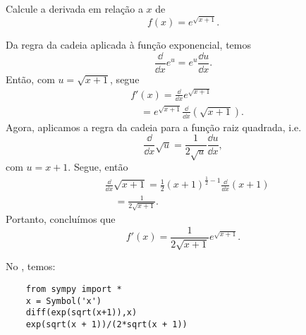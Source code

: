 \begin{exeresol}
  Calcule a derivada em relação a $x$ de
  \begin{equation}
    f(x) = e^{\sqrt{x+1}}.
  \end{equation}
\end{exeresol}
\begin{resol}
  Da regra da cadeia aplicada à função exponencial, temos
  \begin{equation}
    \frac{\dd}{\dd x}e^u = e^u\frac{\dd u}{\dd x}.
  \end{equation}
  Então, com $u = \sqrt{x+1}$, segue
  \begin{align}
    & f'(x) = \frac{\dd}{\dd x}e^{\sqrt{x+1}} \\
    & \text{}\quad = e^{\sqrt{x+1}}\frac{\dd}{\dd x}\left(\sqrt{x+1}\right).
  \end{align}
  Agora, aplicamos a regra da cadeia para a função raiz quadrada, i.e.
  \begin{equation}
    \frac{\dd}{\dd x}\sqrt{u} = \frac{1}{2\sqrt{u}}\frac{\dd u}{\dd x},
  \end{equation}
  com $u = x+1$. Segue, então
  \begin{align}
    & \frac{\dd}{\dd x}\sqrt{x+1} = \frac{1}{2}(x+1)^{\frac{1}{2}-1}\frac{\dd}{\dd x}(x+1) \\
    & \text{}\quad = \frac{1}{2\sqrt{x+1}}.
  \end{align}
  Portanto, concluímos que
  \begin{equation}
    f'(x) = \frac{1}{2\sqrt{x+1}}e^{\sqrt{x+1}}.
  \end{equation}

  \ifispython
  No \sympy, temos:
  \begin{lstlisting}
    from sympy import *
    x = Symbol('x')
    diff(exp(sqrt(x+1)),x)
    exp(sqrt(x + 1))/(2*sqrt(x + 1))
  \end{lstlisting}
  \fi  
\end{resol}

